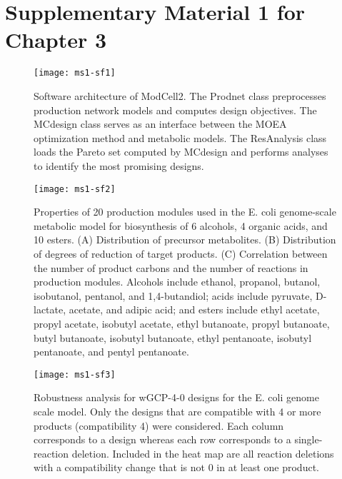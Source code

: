 \section{Supplementary Material 1 for Chapter 3}


\newcommand{\hbAppendixPrefix}{A}
%
\renewcommand{\thefigure}{\hbAppendixPrefix\arabic{figure}}
\setcounter{figure}{0}
\renewcommand{\thetable}{\hbAppendixPrefix\arabic{table}}
\setcounter{table}{0}
\renewcommand{\theequation}{\hbAppendixPrefix\arabic{equation}}
\setcounter{equation}{0}

\begin{figure}[h]
  \centering
  \texttt{[image: ms1-sf1]}
    \caption[Software architecture of ModCell2]{Software architecture of ModCell2. The Prodnet class preprocesses production network models and computes design objectives. The MCdesign class serves as an interface between the MOEA optimization method and metabolic models. The ResAnalysis class loads the Pareto set computed by MCdesign and performs analyses to identify the most promising designs.}
\end{figure}

\begin{figure}[h]
  \centering
  \texttt{[image: ms1-sf2]}
    \caption[Biochemical properties of production modules]{Properties of 20 production modules used in the E. coli genome-scale metabolic model for biosynthesis of 6 alcohols, 4 organic acids, and 10 esters. (A) Distribution of precursor metabolites. (B) Distribution of degrees of reduction of target products. (C) Correlation between the number of product carbons and the number of reactions in production modules. Alcohols include ethanol, propanol, butanol, isobutanol, pentanol, and 1,4-butandiol; acids include pyruvate, D-lactate, acetate, and adipic acid; and esters include ethyl acetate, propyl acetate, isobutyl acetate, ethyl butanoate, propyl butanoate, butyl butanoate, isobutyl butanoate, ethyl pentanoate, isobutyl pentanoate, and pentyl pentanoate.
    }
\end{figure}

\begin{figure}[h]
  \centering
  \texttt{[image: ms1-sf3]}
    \caption[Robustness analysis of designs]{Robustness analysis for wGCP-4-0 designs for the E. coli genome scale model. Only the designs that are compatible with 4 or more products (compatibility  4) were considered. Each column corresponds to a design whereas each row corresponds to a single-reaction deletion. Included in the heat map are all reaction deletions with a compatibility change that is not 0 in at least one product.
    }
\end{figure}

